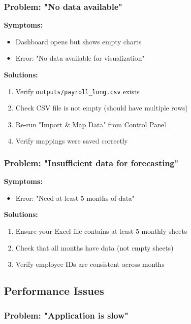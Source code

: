 \documentclass[11pt,a4paper]{article}
\begin{document}
\subsubsection{Problem: "No data available"}

\textbf{Symptoms:}
\begin{itemize}[leftmargin=*]
    \item Dashboard opens but shows empty charts
    \item Error: "No data available for visualization"
\end{itemize}

\textbf{Solutions:}
\begin{enumerate}[leftmargin=*]
    \item Verify \texttt{outputs/payroll\_long.csv} exists
    \item Check CSV file is not empty (should have multiple rows)
    \item Re-run "Import \& Map Data" from Control Panel
    \item Verify mappings were saved correctly
\end{enumerate}

\subsubsection{Problem: "Insufficient data for forecasting"}

\textbf{Symptoms:}
\begin{itemize}[leftmargin=*]
    \item Error: "Need at least 5 months of data"
\end{itemize}

\textbf{Solutions:}
\begin{enumerate}[leftmargin=*]
    \item Ensure your Excel file contains at least 5 monthly sheets
    \item Check that all months have data (not empty sheets)
    \item Verify employee IDs are consistent across months
\end{enumerate}

\subsection{Performance Issues}

\subsubsection{Problem: "Application is slow"}
\end{document}
